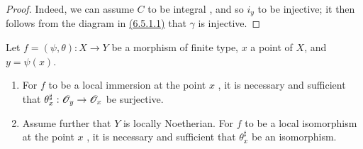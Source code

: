 \begin{proof}
\label{proof-1.6.5.3}
Indeed, we can assume $C$ to be integral , and so $i_y$ to be injective;
it then follows from the diagram in \hyperref[1.6.5.1]{(6.5.1.1)} that $\gamma$ is injective.
\end{proof}

\begin{prop}[6.5.4]
\label{1.6.5.4}
Let $f=(\psi,\theta):X\to Y$ be a morphism of finite type, $x$ a point of $X$, and $y=\psi(x)$.
\begin{enumerate}[label=\emph{(\roman*)}]
  \item For $f$ to be a local immersion at the point $x$ , it is necessary and sufficient that $\theta_x^\sharp:\mathscr{O}_y\to\mathscr{O}_x$ be surjective.
  \item Assume further that $Y$ is locally Noetherian.
    For $f$ to be a local isomorphism at the point $x$ , it is necessary and sufficient that $\theta_x^\sharp$ be an isomorphism.
\end{enumerate}
\end{prop}

